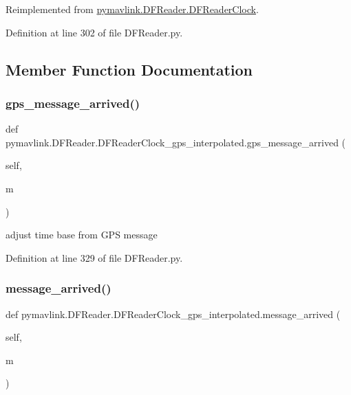 Reimplemented from \mbox{\hyperlink{classpymavlink_1_1DFReader_1_1DFReaderClock_a99d4363951b5ef9866cbd021ca4dd80f}{pymavlink.\+D\+F\+Reader.\+D\+F\+Reader\+Clock}}.



Definition at line 302 of file D\+F\+Reader.\+py.



\subsection{Member Function Documentation}
\mbox{\label{classpymavlink_1_1DFReader_1_1DFReaderClock__gps__interpolated_ab5c7d16117c7dc486fcd820a8558ef13}} 
\subsubsection{\texorpdfstring{gps\_message\_arrived()}{gps\_message\_arrived()}}
{\footnotesize\ttfamily def pymavlink.\+D\+F\+Reader.\+D\+F\+Reader\+Clock\+\_\+gps\+\_\+interpolated.\+gps\+\_\+message\+\_\+arrived (\begin{DoxyParamCaption}\item[{}]{self,  }\item[{}]{m }\end{DoxyParamCaption})}

\begin{DoxyVerb}adjust time base from GPS message\end{DoxyVerb}
 

Definition at line 329 of file D\+F\+Reader.\+py.

\mbox{\label{classpymavlink_1_1DFReader_1_1DFReaderClock__gps__interpolated_a299f6e30eda10492ab18a321a09a15fa}} 
\subsubsection{\texorpdfstring{message\_arrived()}{message\_arrived()}}
{\footnotesize\ttfamily def pymavlink.\+D\+F\+Reader.\+D\+F\+Reader\+Clock\+\_\+gps\+\_\+interpolated.\+message\+\_\+arrived (\begin{DoxyParamCaption}\item[{}]{self,  }\item[{}]{m }\end{DoxyParamCaption})}



